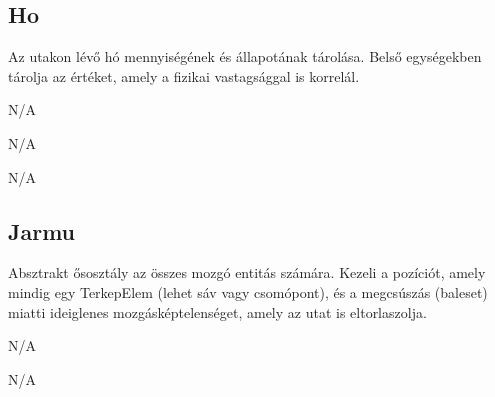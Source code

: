 \subsection{Ho}
\begin{class-template-responsibility}
    Az utakon lévő hó mennyiségének és állapotának tárolása. Belső egységekben tárolja az értéket, amely a fizikai vastagsággal is korrelál.
\end{class-template-responsibility}
\begin{class-template-baseclass}
    N/A
\end{class-template-baseclass}
\begin{class-template-interface}
    N/A
\end{class-template-interface}
\begin{class-template-attribute}
\end{class-template-attribute}
\begin{class-template-method}
    N/A
\end{class-template-method}

\subsection{Jarmu}
\begin{class-template-responsibility}
    Absztrakt ősosztály az összes mozgó entitás számára. Kezeli a pozíciót, amely mindig egy TerkepElem (lehet sáv vagy csomópont), és a megcsúszás (baleset) miatti ideiglenes mozgásképtelenséget, amely az utat is eltorlaszolja.
\end{class-template-responsibility}
\begin{class-template-baseclass}
    N/A
\end{class-template-baseclass}
\begin{class-template-interface}
    N/A
\end{class-template-interface}
\begin{class-template-attribute}
\end{class-template-attribute}
\begin{class-template-method}
\end{class-template-method}

